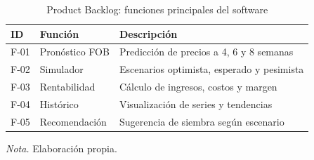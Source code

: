 \begin{table}[H]
\centering
\caption{Product Backlog: funciones principales del software}
\label{tab:product_backlog}
\small
\begin{tabularx}{\textwidth}{p{1.2cm}p{3.5cm}X}
\toprule
\textbf{ID} & \textbf{Funci\'on} & \textbf{Descripci\'on} \\
\midrule
F-01 & Pron\'ostico FOB & Predicci\'on de precios a 4, 6 y 8 semanas \\
F-02 & Simulador & Escenarios optimista, esperado y pesimista \\
F-03 & Rentabilidad & C\'alculo de ingresos, costos y margen \\
F-04 & Hist\'orico & Visualizaci\'on de series y tendencias \\
F-05 & Recomendaci\'on & Sugerencia de siembra seg\'un escenario \\
\bottomrule
\end{tabularx}
\parbox{0.94\textwidth}{\small \textit{Nota.} Elaboraci\'on propia.}
\end{table}
